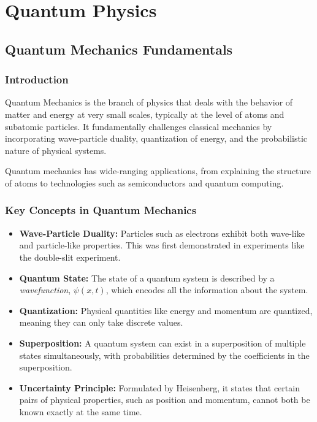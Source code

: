\chapter{Quantum Physics}

\section{Quantum Mechanics Fundamentals}

\subsection{Introduction}
Quantum Mechanics is the branch of physics that deals with the behavior of matter and energy at very small scales, typically at the level of atoms and subatomic particles. It fundamentally challenges classical mechanics by incorporating wave-particle duality, quantization of energy, and the probabilistic nature of physical systems.

Quantum mechanics has wide-ranging applications, from explaining the structure of atoms to technologies such as semiconductors and quantum computing.

\subsection{Key Concepts in Quantum Mechanics}
\begin{itemize}
    \item \textbf{Wave-Particle Duality:} Particles such as electrons exhibit both wave-like and particle-like properties. This was first demonstrated in experiments like the double-slit experiment.
    \item \textbf{Quantum State:} The state of a quantum system is described by a \textit{wavefunction}, $\psi(x,t)$, which encodes all the information about the system.
    \item \textbf{Quantization:} Physical quantities like energy and momentum are quantized, meaning they can only take discrete values.
    \item \textbf{Superposition:} A quantum system can exist in a superposition of multiple states simultaneously, with probabilities determined by the coefficients in the superposition.
    \item \textbf{Uncertainty Principle:} Formulated by Heisenberg, it states that certain pairs of physical properties, such as position and momentum, cannot both be known exactly at the same time.
\end{itemize}


